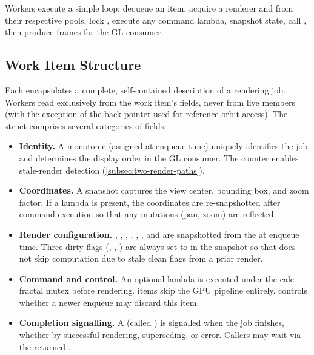 Workers execute a simple loop: dequeue an item, acquire a renderer and
 from their respective pools, lock
, execute any command lambda, snapshot state, call
, then produce frames for the GL consumer.

\subsection{Work Item Structure}%
\label{subsec:work-item-struct}

Each  encapsulates a complete, self-contained
description of a rendering job.  Workers read exclusively from the work
item's fields, never from live  members (with the
exception of the  back-pointer used for reference
orbit access).  The struct comprises several categories of fields:

\begin{itemize}
  \item \textbf{Identity.}  A monotonic 
        (assigned at enqueue time) uniquely identifies the job and
        determines the display order in the GL consumer.  The
         counter enables stale-render
        detection (\cref{subsec:two-render-paths}).
  \item \textbf{Coordinates.}  A 
        snapshot captures the view center, bounding box, and zoom
        factor.  If a  lambda is present, the
        coordinates are re-snapshotted after command execution so that
        any mutations (pan, zoom) are reflected.
  \item \textbf{Render configuration.}  ,
        , ,
        , ,
        , and  are
        snapshotted from the  at enqueue time.
        Three dirty flags (,
        , ) are
        always set to  in the snapshot so that
         does not skip computation due to
        stale clean flags from a prior render.
  \item \textbf{Command and control.}  An optional
         lambda is executed under the calc-fractal
        mutex before rendering.   items skip the
        GPU pipeline entirely.   controls whether
        a newer enqueue may discard this item.
  \item \textbf{Completion signalling.}  A
        (called ) is signalled when the job
        finishes, whether by successful rendering, superseding, or
        error.  Callers may wait via the returned
        .
\end{itemize}

